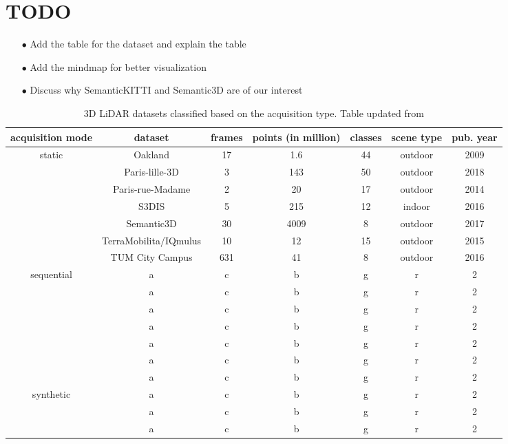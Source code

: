 \section{TODO}
\begin{itemize}
    \item[$\bullet$] Add the table for the dataset and explain the table
    \item[$\bullet$] Add the mindmap for better visualization
    \item[$\bullet$] Discuss why SemanticKITTI and Semantic3D are of our interest     
\end{itemize}

\begin{table}[h!]
    \centering
    \begin{tabular}{c|c|c|c|c|c|c}
        \hline
        acquisition mode & dataset & frames & points (in million) & classes & scene type & pub. year \\
        \hline
        \multirow{7}{*}{static} & Oakland & 17 & 1.6 &  44 & outdoor & 2009 \\ 
                                & Paris-lille-3D & 3 & 143 & 50 & outdoor & 2018 \\
                                & Paris-rue-Madame & 2 & 20 & 17 & outdoor & 2014 \\
                                & S3DIS & 5 & 215 & 12 & indoor & 2016 \\
                                & Semantic3D & 30 & 4009 & 8 & outdoor & 2017 \\
                                & TerraMobilita/IQmulus & 10 & 12 & 15 & outdoor & 2015 \\
                                & TUM City Campus & 631 & 41 & 8 & outdoor & 2016 \\
        \hline
        \multirow{7}{*}{sequential} & a& c& b& g& r& 2\\
                                    & a& c& b& g& r& 2\\
                                    & a& c& b& g& r& 2\\
                                    & a& c& b& g& r& 2\\
                                    & a& c& b& g& r& 2\\
                                    & a& c& b& g& r& 2\\
                                    & a& c& b& g& r& 2\\
        \hline
        \multirow{3}{*}{synthetic} & a& c& b& g& r& 2\\
                                   & a& c& b& g& r& 2\\
                                   & a& c& b& g& r& 2\\
        \hline
    \end{tabular}
    \caption{3D LiDAR datasets classified based on the acquisition type. Table updated from \cite{survey3d}}
    \label{table:3d_lidar_datasets_table}
\end{table}

